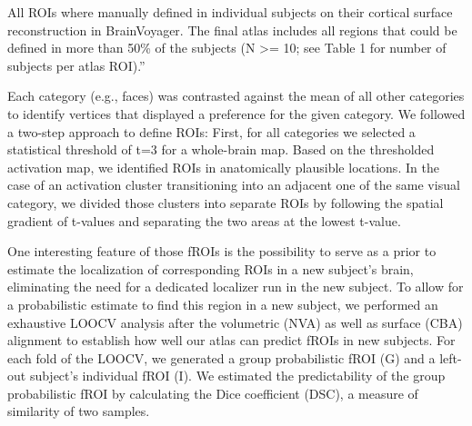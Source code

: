 All ROIs where manually defined in individual subjects on their cortical
surface reconstruction in BrainVoyager.
%
The final atlas includes all regions that could be defined in more than 50\% of
the subjects (N >= 10; see Table 1 for number of subjects per atlas ROI).''

Each category (e.g., faces) was contrasted against the mean of all other
categories to identify vertices that displayed a preference for the given
category.
%
We followed a two-step approach to define ROIs:
%
First, for all categories we selected a statistical threshold of t=3 for a
whole-brain map.
%
Based on the thresholded activation map, we identified ROIs in anatomically
plausible locations.
%
In the case of an activation cluster transitioning into an adjacent one of the
same visual category, we divided those clusters into separate ROIs by following
the spatial gradient of t-values and separating the two areas at the lowest
t-value.

One interesting feature of those fROIs is the possibility to serve as a prior
to estimate the localization of corresponding ROIs in a new subject's brain,
eliminating the need for a dedicated localizer run in the new subject.
%
To allow for a probabilistic estimate to find this region in a new subject, we
performed an exhaustive LOOCV analysis after the volumetric (NVA) as well as
surface (CBA) alignment to establish how well our atlas can predict fROIs in new
subjects.
%
For each fold of the LOOCV, we generated a group probabilistic fROI (G) and a
left-out subject's individual fROI (I).
%
We estimated the predictability of the group probabilistic fROI by calculating
the Dice coefficient (DSC), a measure of similarity of two samples.

